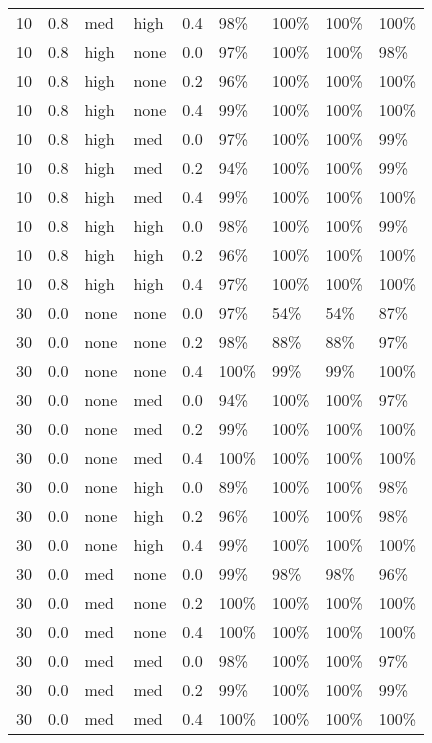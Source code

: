 \begin{longtable}{rrllrllll}
  10 & 0.8 & med & high & 0.4 & 98\% & 100\% & 100\% & 100\% \\ 
  10 & 0.8 & high & none & 0.0 & 97\% & 100\% & 100\% & 98\% \\ 
  10 & 0.8 & high & none & 0.2 & 96\% & 100\% & 100\% & 100\% \\ 
  10 & 0.8 & high & none & 0.4 & 99\% & 100\% & 100\% & 100\% \\ 
  10 & 0.8 & high & med & 0.0 & 97\% & 100\% & 100\% & 99\% \\ 
  10 & 0.8 & high & med & 0.2 & 94\% & 100\% & 100\% & 99\% \\ 
  10 & 0.8 & high & med & 0.4 & 99\% & 100\% & 100\% & 100\% \\ 
  10 & 0.8 & high & high & 0.0 & 98\% & 100\% & 100\% & 99\% \\ 
  10 & 0.8 & high & high & 0.2 & 96\% & 100\% & 100\% & 100\% \\ 
  10 & 0.8 & high & high & 0.4 & 97\% & 100\% & 100\% & 100\% \\ 
  30 & 0.0 & none & none & 0.0 & 97\% & 54\% & 54\% & 87\% \\ 
  30 & 0.0 & none & none & 0.2 & 98\% & 88\% & 88\% & 97\% \\ 
  30 & 0.0 & none & none & 0.4 & 100\% & 99\% & 99\% & 100\% \\ 
  30 & 0.0 & none & med & 0.0 & 94\% & 100\% & 100\% & 97\% \\ 
  30 & 0.0 & none & med & 0.2 & 99\% & 100\% & 100\% & 100\% \\ 
  30 & 0.0 & none & med & 0.4 & 100\% & 100\% & 100\% & 100\% \\ 
  30 & 0.0 & none & high & 0.0 & 89\% & 100\% & 100\% & 98\% \\ 
  30 & 0.0 & none & high & 0.2 & 96\% & 100\% & 100\% & 98\% \\ 
  30 & 0.0 & none & high & 0.4 & 99\% & 100\% & 100\% & 100\% \\ 
  30 & 0.0 & med & none & 0.0 & 99\% & 98\% & 98\% & 96\% \\ 
  30 & 0.0 & med & none & 0.2 & 100\% & 100\% & 100\% & 100\% \\ 
  30 & 0.0 & med & none & 0.4 & 100\% & 100\% & 100\% & 100\% \\ 
  30 & 0.0 & med & med & 0.0 & 98\% & 100\% & 100\% & 97\% \\ 
  30 & 0.0 & med & med & 0.2 & 99\% & 100\% & 100\% & 99\% \\ 
  30 & 0.0 & med & med & 0.4 & 100\% & 100\% & 100\% & 100\% \\ 

\end{longtable}
